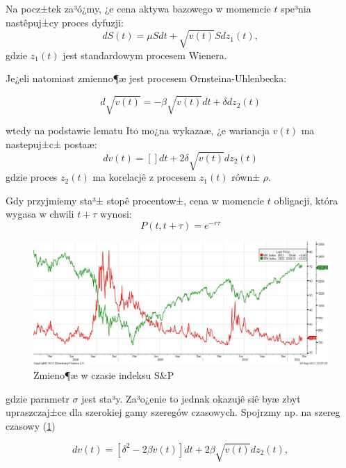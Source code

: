 \documentclass{pracamgr}
\begin{document}
Na pocz±tek za³ó¿my, ¿e cena aktywa bazowego w momemcie $t$ spe³nia nastêpuj±cy proces dyfuzji:
\begin{equation}
dS(t)= \mu S dt + \sqrt{v(t)} S d z_1 (t),
\end{equation}
gdzie $z_1(t)$  jest standardowym procesem Wienera. 

Je¿eli natomiast zmienno¶æ jest procesem Ornsteina-Uhlenbecka:

\begin{equation}
d \sqrt{v(t)} = - \beta \sqrt{v(t)} dt + \delta d z_2 (t)
\end{equation}

wtedy na podstawie lematu Ito mo¿na wykazaæ, ¿e wariancja $v(t)$ ma nastepuj±c± postaæ:
\begin{equation}
dv(t)= []dt+2\delta \sqrt{v(t)} d z_2 (t)
\end{equation}
gdzie proces $z_2(t)$ ma korelacjê z procesem $z_1(t)$ równ± $\rho$.

Gdy przyjmiemy sta³± stopê procentow±, cena w momencie $t$ obligacji, która wygasa w chwili $t+\tau$ wynosi:
\begin{equation}
P(t, t+\tau) = e^{-r\tau}
\end{equation}



\begin{figure}
  \centering
  \includegraphics[width=150mm]{vix.jpg}
  \caption{Zmieno¶æ w czasie indeksu S\&P}\label{fig:vix}
\end{figure}


gdzie parametr $\sigma$ jest sta³y. Za³o¿enie to jednak okazujê siê byæ zbyt upraszczaj±ce dla szerokiej gamy szeregów czasowych. Spojrzmy np. na szereg czasowy  (\ref{fig:vix}) 



\begin{equation}\label{h:ito}
dv(t) = [\delta^2 - 2 \beta v(t)] dt + 2\beta \sqrt{v(t)} dz_2(t),
\end{equation}
\end{document}
